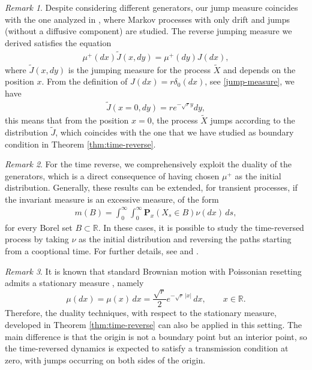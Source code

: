 \documentclass[11pt,a4paper]{article}
\theoremstyle{definition}
\theoremstyle{remark}
\newtheorem{remark}{Remark}
\begin{document}
\begin{remark}
	Despite considering different generators, our jump measure coincides with the one analyzed in \cite{conforti22}, where Markov processes with only drift and jumps (without a diffusive component) are studied. The reverse jumping measure we derived satisfies the equation
	\begin{align*}
		\mu^+(dx) \widetilde{J}(x, dy) = \mu^+(dy)J(dx),
	\end{align*}
	where $\widetilde{J}(x, dy)$ is the jumping measure for the process $\widetilde{X}$ and depends on the position $x$. From the definition of $J(dx)=r \delta_0(dx)$, see \eqref{jump-measure}, we have
	\begin{align*}
		\widetilde{J}(x=0, dy)= r e^{-\sqrt{r} y} dy,
	\end{align*}
	this means that from the position \( x = 0 \), the process $\widetilde{X}$ jumps according to the distribution $\widetilde{J}$, which coincides with the one that we have studied as boundary condition in Theorem \ref{thm:time-reverse}.
\end{remark}
\begin{remark}
	For the time reverse, we comprehensively exploit the duality of the generators, which is a direct consequence of having chosen \(\mu^+\) as the initial distribution. Generally, these results can be extended, for transient processes, if the invariant measure is an excessive measure, of the form
	\begin{align*}
		m(B)=\int_0^\infty \int_0^\infty \mathbf{P}_x(X_s \in B) \nu(dx) \, ds,
	\end{align*}
	for every Borel set $B \subset \mathbb{R}$. In these cases, it is possible to study the time-reversed process by taking \(\nu\) as the initial distribution and reversing the paths starting from a cooptional time. For further details, see \cite{nasawa-markov} and \cite[Theorem 4.5, Chapter VII]{revuz-yor}.
\end{remark}

	\begin{remark}
		It is known that standard Brownian motion with Poissonian resetting admits a 
		stationary measure \cite[Formula (2.18)]{evansreview}, namely
		\[
		\mu(dx) = \mu(x)\,dx = \frac{\sqrt{r}}{2} e^{-\sqrt{r}\,|x|}\,dx, 
		\qquad x \in \mathbb{R}.
		\]
		Therefore, the duality techniques, with respect to the stationary measure, developed in Theorem \ref{thm:time-reverse} 
		can also be applied in this setting. The main difference is that the origin is 
		not a boundary point but an interior point, so the time-reversed dynamics is 
		expected to satisfy a transmission condition at zero, with jumps occurring on 
		both sides of the origin.
\end{remark}
\end{document}
